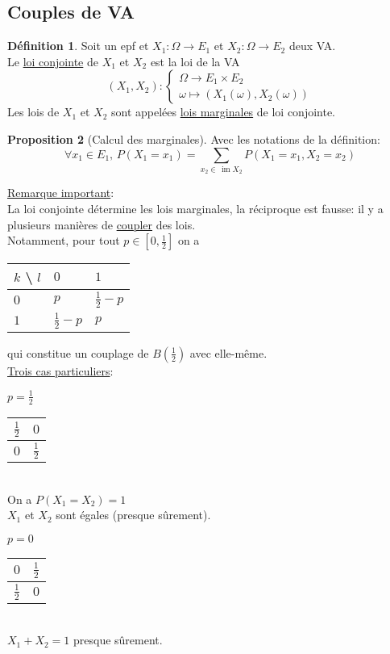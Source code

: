 \documentclass[10pt,a4paper]{article}
\theoremstyle{definition}
\newtheorem{proposition}{Proposition}[section]
\newtheorem{definition}[proposition]{Définition}
\DeclareMathOperator{\im}{im}
\begin{document}
\subsection{Couples de VA}
\begin{definition}
Soit un epf et $X_1: \Omega \to E_1$ et $X_2: \Omega \to E_2$ deux VA. \\
Le \uline{loi conjointe} de $X_1$ et $X_2$ est la loi de la VA
\[ (X_1, X_2) : \begin{cases}
\Omega \to E_1 \times E_2 \\
\omega \mapsto \left(X_1(\omega), X_2(\omega) \right)
\end{cases} \]
Les lois de $X_1$ et $X_2$ sont appelées \uline{lois marginales} de loi conjointe.
\end{definition}
\begin{proposition}[Calcul des marginales]
Avec les notations de la définition:
\[ \forall x_1 \in E_1 ,\, P(X_1 = x_1) = \sum_{x_2 \in \, \im X_2} P(X_1 = x_1, X_2 = x_2) \]
\end{proposition}
\noindent \uline{Remarque important}: \\
La loi conjointe détermine les lois marginales, la réciproque est fausse: il y a plusieurs manières de \uline{coupler} des lois. \\
Notamment, pour tout $p \in \left[ 0, \frac{1}{2} \right]$ on a
\begin{center}
\begin{tabular}{M{3em} | M{3em} | M{3em}}
$k$ \textbackslash $\,\, l$ & $0$ & $1$ \\
\hline
$0$ & $p$ & $\frac{1}{2} - p$ \\
\hline
$1$ & $\frac{1}{2} - p$ & $p$
\end{tabular}
\end{center}
qui constitue un couplage de $B\left(\frac{1}{2} \right)$ avec elle-même. \\
\uline{Trois cas particuliers}: \medskip

$p = \frac{1}{2}$ \quad
\begin{tabular}{M{3em} | M{3em}}
$\frac{1}{2}$ & $0$ \\
\hline
$0$ & $\frac{1}{2}$ \\
\end{tabular} \\
On a $P(X_1 = X_2) = 1$ \\
$X_1$ et $X_2$ sont égales (presque sûrement). \medskip

$p = 0$ \quad
\begin{tabular}{M{3em} | M{3em}}
$0$ & $\frac{1}{2}$ \\
\hline
$\frac{1}{2}$ & $0$ \\
\end{tabular} \\
$X_1 + X_2 = 1$ presque sûrement. \medskip
\end{document}
